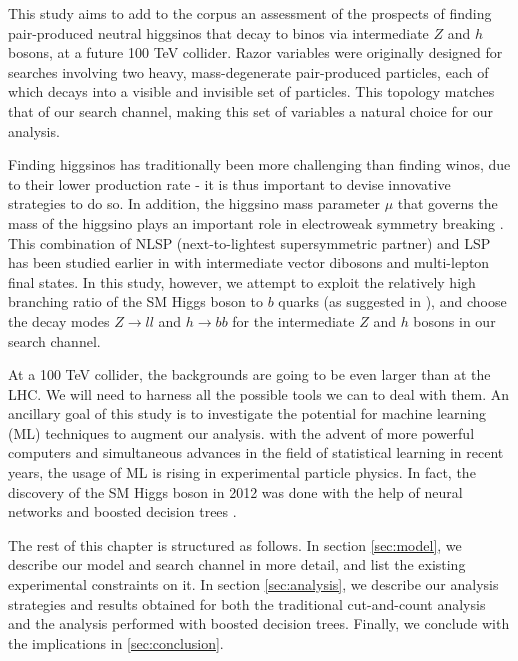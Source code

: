 This study aims to add to the corpus an assessment of the prospects of finding pair-produced neutral higgsinos that decay to binos via intermediate $Z$ and $h$ bosons, at a future 100 TeV collider. Razor variables \citep{Rogan2010} were originally designed for searches involving two heavy, mass-degenerate pair-produced particles, each of which decays into a visible and invisible set of particles. This topology matches that of our search channel, making this set of variables a natural choice for our analysis.

Finding higgsinos has traditionally been more challenging than finding winos, due to their lower production rate - it is thus important to devise innovative strategies to do so. In addition, the higgsino mass parameter $\mu$ that governs the mass of the higgsino plays an important role in electroweak symmetry breaking \citep{Acharya2014}. This combination of NLSP (next-to-lightest supersymmetric partner) and LSP has been studied earlier in \citep{Gori:2014oua} with intermediate vector dibosons and multi-lepton final states. In this study, however, we attempt to exploit the relatively high branching ratio of the SM Higgs boson to $b$ quarks (as suggested in \cite{Han2013}), and choose the decay modes $Z\rightarrow ll$ and $h\rightarrow bb$ for the intermediate $Z$ and $h$ bosons in our search channel.  

At a 100 TeV collider, the backgrounds are going to be even larger than at the LHC. We will need to harness all the possible tools we can to deal with them. An ancillary goal of this study is to investigate the potential for machine learning (ML) techniques to augment our analysis. with the advent of more powerful computers and simultaneous advances in the field of statistical learning in recent years, the usage of ML is rising in experimental particle physics. In fact, the discovery of the SM Higgs boson in 2012 was done with the help of neural networks \citep{ATLASCollaboration2012} and boosted decision trees \citep{CMSCollaboration2012}.

The rest of this chapter is structured as follows. In section \ref{sec:model}, we describe our model and search channel in more detail, and list the existing experimental constraints on it. In section \ref{sec:analysis}, we describe our analysis strategies and results obtained for both the traditional cut-and-count analysis and the analysis performed with boosted decision trees. Finally, we conclude with the implications in \autoref{sec:conclusion}.

